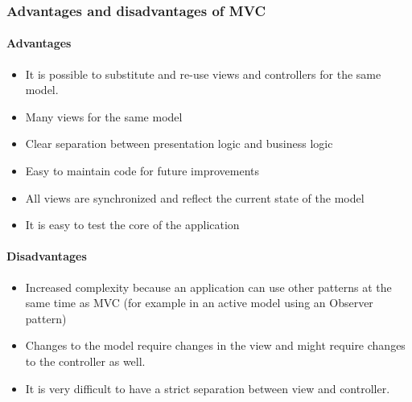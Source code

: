 \subsubsection*{Advantages and disadvantages of MVC}

\paragraph{Advantages}
\begin{itemize}
\item It is possible to substitute and re-use views and controllers for the same model.
\item Many views for the same model 
\item Clear separation between presentation logic and business logic
\item Easy to maintain code for future improvements
\item All views are synchronized and reflect the current state of the model 
\item It is easy to test the core of the application
\end{itemize}

\paragraph{Disadvantages}
\begin{itemize}
\item Increased complexity because an application can use other patterns at the same time as MVC (for example in an active model using an Observer pattern)
\item Changes to the model require changes in the view and might require changes to the controller as well.
\item It is very difficult to have a strict separation between view and controller. 
\end{itemize}